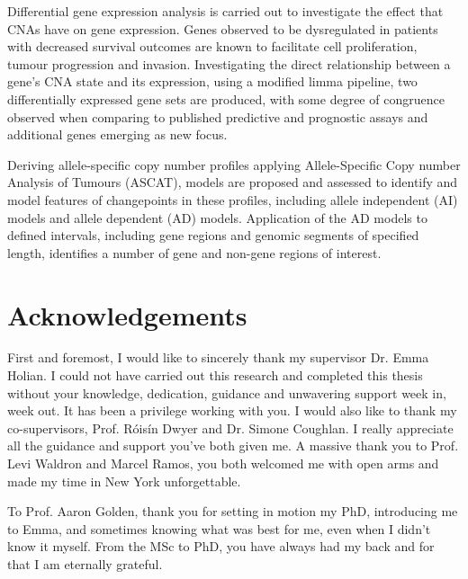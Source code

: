 Differential gene expression analysis is carried out to investigate the effect that CNAs have on gene expression. Genes observed to be dysregulated in patients with decreased survival outcomes are known to facilitate cell proliferation, tumour progression and invasion. Investigating the direct relationship between a gene's CNA state and its expression, using a modified limma pipeline, two differentially expressed gene sets are produced, with some degree of congruence observed when comparing to published predictive and prognostic assays and additional genes emerging as new focus.  

Deriving allele-specific copy number profiles applying Allele-Specific Copy number Analysis of Tumours (ASCAT), models are proposed and assessed to identify and model features of changepoints in these profiles,  including allele independent (AI) models and allele dependent (AD) models. Application of the AD models to defined intervals, including gene regions and genomic segments of specified length, identifies a number of gene and non-gene regions of interest.  
\raggedbottom  

    \section*{\Large{Acknowledgements}} %
    
    
    \vspace{0.5cm}
    
    First and foremost, I would like to sincerely thank my supervisor Dr. Emma Holian. I could not have carried out this research and completed this thesis without your knowledge, dedication, guidance and unwavering support week in, week out. It has been a privilege working with you. I
would also like to thank my co-supervisors, Prof. Róisín Dwyer and Dr. Simone Coughlan. I really appreciate all the guidance and support you've both given me. A massive thank you to Prof. Levi Waldron and Marcel Ramos, you both welcomed me with open arms and made my time in New York unforgettable.

To Prof. Aaron Golden, thank you for setting in motion my PhD, introducing me to Emma, and sometimes knowing what was best for me, even when I didn’t know it myself. From the MSc to PhD, you have always had my back and for that I am eternally grateful.    


